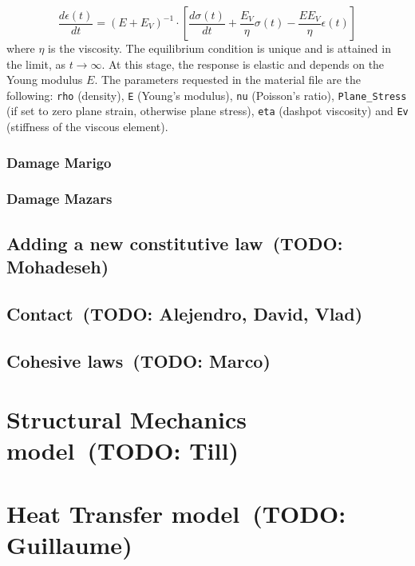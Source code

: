\documentclass[a4paper,11pt]{book}
\newcommand{\code}[1]{\texttt{#1}}
\newcommand{\todo}[1]{~({\small\color{red}\textbf{TODO: }\textbf{#1}})}
\begin{document}
\begin{equation}
    \frac{d\epsilon(t)}{dt} = \left ( E + E_V \right ) ^ {-1} \cdot \left [ \frac{d\sigma(t)}{dt} + \frac{E_V}{\eta}\sigma(t) - \frac{EE_V}{\eta}\epsilon(t) \right ]
\end{equation}
where $\eta$ is the viscosity. The equilibrium condition is unique and is attained in the limit, as $t \to \infty $. At this stage, the response is elastic and depends on the Young modulus $E$.
The parameters requested in the material file are the following: \code{rho} (density), \code{E} (Young's modulus), \code{nu} (Poisson's ratio), \code{Plane\_Stress} (if set to zero plane strain, otherwise plane stress), \code{eta} (dashpot viscosity) and \code{Ev} (stiffness of the viscous element).

\subsubsection{Damage Marigo}
\subsubsection{Damage Mazars}

\subsection{Adding a new constitutive law\todo{Mohadeseh}}

\subsection{Contact\todo{Alejendro, David, Vlad}}

\subsection{Cohesive laws\todo{Marco}}


\section{Structural Mechanics model\todo{Till}}

\section{Heat Transfer model\todo{Guillaume}}

\end{document}
